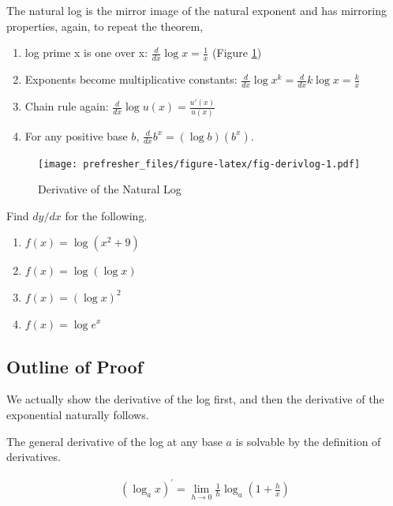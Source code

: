 \documentclass[]{book}
\providecommand{\tightlist}{%
  \setlength{\itemsep}{0pt}\setlength{\parskip}{0pt}}
\theoremstyle{definition}
\theoremstyle{definition}
\theoremstyle{definition}
\theoremstyle{remark}
\let\BeginKnitrBlock\begin \let\EndKnitrBlock\end
\begin{document}
The natural log is the mirror image of the natural exponent and has
mirroring properties, again, to repeat the theorem,

\begin{enumerate}
\def\labelenumi{\arabic{enumi}.}
\tightlist
\item
  log prime x is one over x: \(\frac{d}{dx} \log x = \frac{1}{x}\)
  (Figure \ref{fig:fig-derivlog})
\item
  Exponents become multiplicative constants:
  \(\frac{d}{dx} \log x^k = \frac{d}{dx} k \log x = \frac{k}{x}\)
\item
  Chain rule again: \(\frac{d}{dx} \log u(x) = \frac{u'(x)}{u(x)}\quad\)
\item
  For any positive base \(b\),
  \(\frac{d}{dx} b^x = (\log b)\left(b^x\right)\).
\end{enumerate}

\begin{figure}
\centering
\texttt{[image: prefresher\_files/figure-latex/fig-derivlog-1.pdf]}
\caption{\label{fig:fig-derivlog}Derivative of the Natural Log}
\end{figure}

\BeginKnitrBlock{example}[Derivative of logs]
\protect\hypertarget{exm:exmderivlog}{}{\label{exm:exmderivlog}
{} }Find \(dy/dx\) for the following.

\begin{enumerate}
\def\labelenumi{\arabic{enumi}.}
\tightlist
\item
  \(f(x)=\log(x^2+9)\)
\item
  \(f(x)=\log(\log x)\)
\item
  \(f(x)=(\log x)^2\)
\item
  \(f(x)=\log e^x\)
\end{enumerate}
\EndKnitrBlock{example}

\subsection*{Outline of Proof}\label{outline-of-proof}

We actually show the derivative of the log first, and then the
derivative of the exponential naturally follows.

The general derivative of the log at any base \(a\) is solvable by the
definition of derivatives.

\begin{align*}
(\log_a x)^\prime = \lim\limits_{h\to 0} \frac{1}{h}\log_{a}\left(1 + \frac{h}{x}\right)
\end{align*}
\end{document}
